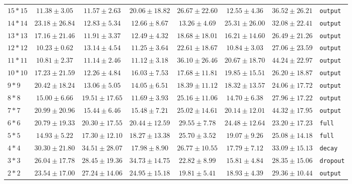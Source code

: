 \documentclass[conference]{IEEEtran}
\begin{document}
\begin{longtable}{@{}lccccccl@{}}
$15*15$ & $11.38 \pm 3.05$ & $11.57 \pm 2.63$ & $20.06 \pm 18.82$ & $26.67 \pm 22.60$ & $12.55 \pm 4.36$ & \bfseries $36.52 \pm 26.21$ & \texttt{output} \\
$14*14$ & $23.18 \pm 26.84$ & $12.83 \pm 5.34$ & $12.66 \pm 8.67$ & $13.26 \pm 4.69$ & $25.31 \pm 26.00$ & \bfseries $32.08 \pm 22.41$ & \texttt{output} \\
$13*13$ & $17.16 \pm 21.46$ & $11.91 \pm 3.37$ & $12.49 \pm 4.32$ & $18.68 \pm 18.01$ & $16.21 \pm 14.60$ & \bfseries $26.49 \pm 21.26$ & \texttt{output} \\
$12*12$ & $10.23 \pm 0.62$ & $13.14 \pm 4.54$ & $11.25 \pm 3.64$ & $22.61 \pm 18.67$ & $10.84 \pm 3.03$ & \bfseries $27.06 \pm 23.59$ & \texttt{output} \\
$11*11$ & $10.81 \pm 2.37$ & $11.14 \pm 2.46$ & $11.12 \pm 3.18$ & $36.10 \pm 26.46$ & $20.67 \pm 18.70$ & \bfseries $44.24 \pm 22.97$ & \texttt{output} \\
$10*10$ & $17.23 \pm 21.59$ & $12.26 \pm 4.84$ & $16.03 \pm 7.53$ & $17.68 \pm 11.81$ & $19.85 \pm 15.51$ & \bfseries $26.20 \pm 18.87$ & \texttt{output} \\
$9*9$ & $20.42 \pm 18.24$ & $13.06 \pm 5.05$ & $14.05 \pm 6.51$ & $18.39 \pm 11.12$ & $18.32 \pm 13.57$ & \bfseries $24.06 \pm 17.72$ & \texttt{output} \\
$8*8$ & $15.00 \pm 6.66$ & $19.51 \pm 17.65$ & $11.69 \pm 3.93$ & $25.16 \pm 11.06$ & $14.70 \pm 6.38$ & \bfseries $27.96 \pm 17.22$ & \texttt{output} \\
$7*7$ & $20.99 \pm 20.96$ & $15.44 \pm 6.46$ & $15.48 \pm 7.21$ & $25.02 \pm 14.61$ & $20.14 \pm 12.01$ & \bfseries $44.32 \pm 17.95$ & \texttt{output} \\
$6*6$ & $20.79 \pm 19.33$ & $20.30 \pm 17.55$ & $20.44 \pm 12.59$ & \bfseries $29.55 \pm 7.78$ & $24.48 \pm 12.64$ & $23.20 \pm 17.23$ & \texttt{full} \\
$5*5$ & $14.93 \pm 5.22$ & $17.30 \pm 12.10$ & $18.27 \pm 13.38$ & \bfseries $25.70 \pm 3.52$ & $19.07 \pm 9.26$ & $25.08 \pm 14.18$ & \texttt{full} \\
$4*4$ & $30.30 \pm 21.80$ & \bfseries $34.51 \pm 28.07$ & $17.98 \pm 8.90$ & $26.77 \pm 10.55$ & $17.79 \pm 7.12$ & $33.09 \pm 15.13$ & \texttt{decay} \\
$3*3$ & $26.04 \pm 17.78$ & $28.45 \pm 19.36$ & \bfseries $34.73 \pm 14.75$ & $22.82 \pm 8.99$ & $15.81 \pm 4.84$ & $28.35 \pm 15.06$ & \texttt{dropout} \\
$2*2$ & $23.54 \pm 17.00$ & $27.24 \pm 14.06$ & $24.95 \pm 15.18$ & $19.81 \pm 5.41$ & $18.93 \pm 4.39$ & \bfseries $29.36 \pm 10.44$ & \texttt{output} \\

\end{longtable}
\end{document}
